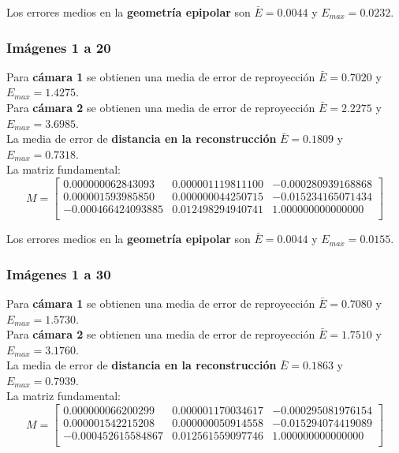 \documentclass[a4paper, fontsize=11pt]{scrartcl} %
\numberwithin{equation}{section} %
\numberwithin{figure}{section} %
\numberwithin{table}{section} %
\begin{document}
	Los errores medios en la \textbf{geometría epipolar} son $\bar{E} = 0.0044$ y $E_{max} = 0.0232$.
	
	\subsubsection*{Imágenes 1 a 20}
	
	Para \textbf{cámara 1} se obtienen una media de error de reproyección $\bar{E} = 0.7020$ y $E_{max} = 1.4275$.\\
	Para \textbf{cámara 2} se obtienen una media de error de reproyección $\bar{E} = 2.2275$ y $E_{max} = 3.6985$.\\
	
	La media de error de \textbf{distancia en la reconstrucción} $\bar{E} = 0.1809$ y $E_{max} = 0.7318$.\\
	La matriz fundamental:
	\[
	M=
	\begin{bmatrix}
	0.000000062843093&	0.000001119811100&	-0.000280939168868 \\
	0.000001593985850&	0.000000044250715&	-0.015234165071434 \\
	-0.000466424093885&	0.012498294940741&	1.000000000000000  \\
	
	\end{bmatrix}
	\]
	
	Los errores medios en la \textbf{geometría epipolar} son $\bar{E} = 0.0044$ y $E_{max} = 0.0155$.
	
	\subsubsection*{Imágenes 1 a 30}
	
	Para \textbf{cámara 1} se obtienen una media de error de reproyección $\bar{E} = 0.7080$ y $E_{max} = 1.5730$.\\
	Para \textbf{cámara 2} se obtienen una media de error de reproyección $\bar{E} = 1.7510$ y $E_{max} = 3.1760$.\\
	
	La media de error de \textbf{distancia en la reconstrucción} $\bar{E} = 0.1863$ y $E_{max} = 0.7939$.\\
	La matriz fundamental:
	\[
	M=
	\begin{bmatrix}
	0.000000066200299&	0.000001170034617&	-0.000295081976154 \\
	0.000001542215208&	0.000000050914558&	-0.015294074419089 \\
	-0.000452615584867&	0.012561559097746&	1.000000000000000  \\
	
	\end{bmatrix}
	\]
	
\end{document}
